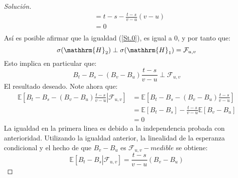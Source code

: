\documentclass[11pt,notitlepage]{article}
\newenvironment{solucion}
  {\begin{proof}[Solución]}
  {\end{proof}}
\begin{document}
\begin{enumerate}
\begin{solucion}
\begin{align*}
        &= t-s - \frac{t-s}{v-u}(v-u)\\
        &=0\\
    \end{align*}
    Así es posible afirmar que la igualdad (\ref{St.0}), es igual a 0, y por tanto que:
    \[\sigma(\mathhrm{H}_2)\perp\sigma(\mathhrm{H}_1) = \mathcal{F}_{u,v}\]
    Esto implica en particular que: 
    \[B_t -B_s -(B_v -B_u)\frac{t-s}{v-u} \perp \mathcal{F}_{u,v}\]
    El resultado deseado.
    Note ahora que: 
    \begin{align*}
        \mathbb{E}\left[B_t -B_s -(B_v -B_u)\frac{t-s}{v-u}\left. \right|\mathcal{F}_{u,v}\right]&=\mathbb{E}\left[B_t -B_s -(B_v -B_u)\frac{t-s}{v-u}\right]\\
        &=\mathbb{E}\left[B_t -B_s\right] - \frac{t-s}{v-u}\mathbb{E}\left[B_v -B_u\right]\\
        &=0
    \end{align*}
    La igualdad en la primera linea es debido a la independencia probada con anterioridad. Utilizando la igualdad anterior, la linealidad de la esperanza condicional y el hecho de que \(B_v - B_u\) es \(\mathcal{F}_{u,v}-medible\) se obtiene:
    \[\mathbb{E}\left[B_t - B_s \left|\right. \mathcal{F}_{u,v} \right] = \frac{t-s}{v-u}(B_v - B_u)\]
    

\end{solucion}
\end{enumerate}
\end{document}
